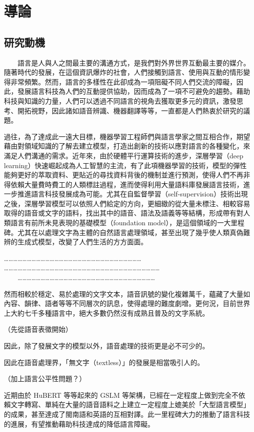 \chapter{導論}
\section{研究動機}

　　語言是人與人之間最主要的溝通方式，是我們對外界世界互動最主要的媒介。隨著時代的發展，在這個資訊爆炸的社會，人們接觸到語言、使用與互動的情形變得非常頻繁。然而，語言的多樣性在此卻成為一項阻礙不同人們交流的障礙，因此，發展語言科技為人們的互動提供協助，因而成為了一項不可避免的趨勢。藉助科技與知識的力量，人們可以透過不同語言的視角去獲取更多元的資訊，激發思考、開拓視野，因此諸如語音辨識、機器翻譯等等，一直都是人們熱衷於研究的議題。

    過往，為了達成此一遠大目標，機器學習工程師們與語言學家之間互相合作，期望藉由對領域知識的了解去建立模型，打造出創新的技術以應對語言的各種變化，來滿足人們溝通的需求。近年來，由於硬體平行運算技術的進步，深層學習（deep learning）快速崛起成為人工智慧的主流，有了此項機器學習的技術，模型的彈性能夠更好的萃取資料、更貼近的尋找資料背後的機制並進行預測，使得人們不再非得依賴大量費時費工的人類標註過程，進而使得利用大量語料庫發展語言技術，進一步推進語言科技發展成為可能。尤其在自監督學習（self-supervision）技術出現之後，深層學習模型可以依照人們給定的方向，更細緻的從大量未標注、相較容易取得的語音或文字的語料，找出其中的語音、語法及語義等等結構，形成帶有對人類語言有前所未見表現的基礎模型（foundation model），是這個領域的一大里程碑。尤其在以處理文字為主體的自然語言處理領域，甚至出現了幾乎使人類真偽難辨的生成式模型，改變了人們生活的方方面面。

    ……………………………………………………………………………… \\
    ………………………………………………………………………………………… \\
　　………………………………………………………………………………

    然而相較於穩定、易於處理的文字文本，語音訊號的變化複雜萬千，蘊藏了大量如內容、韻律、語者等等不同層次的訊息，使得處理的難度劇增。更何況，目前世界上大約七千多種語言中，絕大多數仍然沒有成熟且普及的文字系統。

    （先從語音表徵開始）

    因此，除了發展文字的模型以外，語音處理的技術更是必不可少的。

    因此在語音處理界，「無文字（textless）」的發展是相當吸引人的。

    （加上語言公平性問題？）

    近期由於 HuBERT 等等起來的 GSLM 等架構，已經在一定程度上做到完全不依賴文字轉寫、單純在大量的語音語料之上建立一定程度上媲美於「大型語言模型」的成果，甚至達成了閩南語和英語的互相對譯。此一里程碑大力的推動了語言科技的進展，有望推動藉助科技達成的降低語言障礙。

